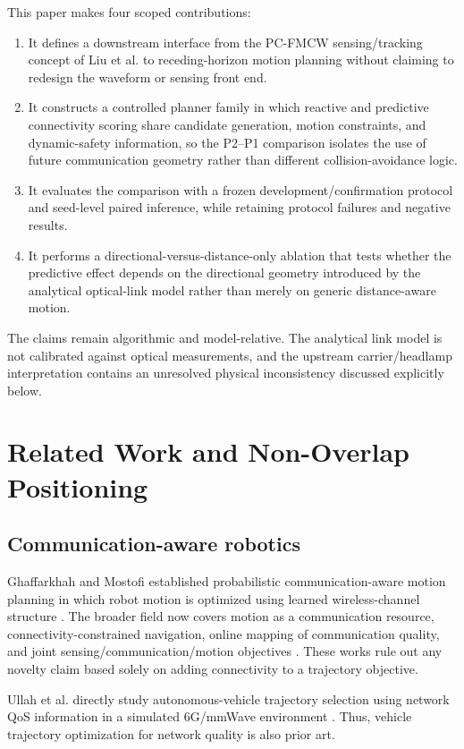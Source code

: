 \documentclass[journal]{IEEEtran}
\begin{document}
This paper makes four scoped contributions:
\begin{enumerate}
\item It defines a downstream interface from the PC-FMCW sensing/tracking concept of Liu et al. \cite{liu2026} to receding-horizon motion planning without claiming to redesign the waveform or sensing front end.
\item It constructs a controlled planner family in which reactive and predictive connectivity scoring share candidate generation, motion constraints, and dynamic-safety information, so the P2--P1 comparison isolates the use of future communication geometry rather than different collision-avoidance logic.
\item It evaluates the comparison with a frozen development/confirmation protocol and seed-level paired inference, while retaining protocol failures and negative results.
\item It performs a directional-versus-distance-only ablation that tests whether the predictive effect depends on the directional geometry introduced by the analytical optical-link model rather than merely on generic distance-aware motion.
\end{enumerate}

The claims remain algorithmic and model-relative. The analytical link model is not calibrated against optical measurements, and the upstream carrier/headlamp interpretation contains an unresolved physical inconsistency discussed explicitly below.

\section{Related Work and Non-Overlap Positioning}
\subsection{Communication-aware robotics}
Ghaffarkhah and Mostofi established probabilistic communication-aware motion planning in which robot motion is optimized using learned wireless-channel structure \cite{ghaffarkhah2011}. The broader field now covers motion as a communication resource, connectivity-constrained navigation, online mapping of communication quality, and joint sensing/communication/motion objectives \cite{muralidharan2021,hurst2021,cai2022,gordon2026}. These works rule out any novelty claim based solely on adding connectivity to a trajectory objective.

Ullah et al. directly study autonomous-vehicle trajectory selection using network QoS information in a simulated 6G/mmWave environment \cite{ullah2025}. Thus, vehicle trajectory optimization for network quality is also prior art.
\end{document}
